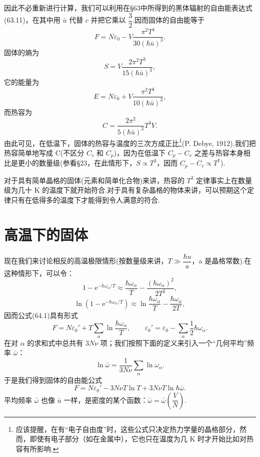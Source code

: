 因此不必重新进行计算，我们可以利用在§63中所得到的黑体辐射的自由能表达式(63.11)，在其中用 $\bar{u}$ 代替 $c$ 并把它乘以 $\dfrac{3}{2}$.因而固体的自由能等于
\begin{equation}
  F=N\varepsilon_0-V\frac{\pi^2T^4}{30(\hbar\bar{u})^3}.
\end{equation}
固体的熵为
\begin{equation}
  S=V\frac{2\pi^2T^3}{15(\hbar\bar{u})^3},
\end{equation}
它的能量为
\begin{equation}
  E=N\varepsilon_0+V\frac{\pi^2T^4}{10(\hbar\bar{u})^3},
\end{equation}
而热容为
\begin{equation}
  C=\frac{2\pi^2}{5(\hbar\bar{u})^3}T^3V.
\end{equation}
由此可见，在低温下，固体的热容与温度的三次方成正比\footnote{应该提醒，在有“电子自由度”时，这些公式只决定热力学量的晶格部分，然而，即使有电子部分（如在金属中），它也只在温度为几 $\mathrm{K}$ 时才开始比如对热容有所影响.}(P. Debye, 1912).我们把热容简单地写成 C(不区分 $C_v$ 和 $C_p$)，因为在低温下 $C_p-C_v$ 之差与热容本身相比是更小的数量级(参看§23，在此情形下，$S\propto T^3$，因而 $C_p-C_v\propto T^7$).

对于具有简单晶格的固体(元素和简单化合物)来讲，热容的 $T^3$ 定律事实上在数量级为几十 K 的温度下就开始符合.对于具有复杂晶格的物体来讲，可以预期这个定律只有在低得多的温度下才能得到令人满意的符合.

\section{高温下的固体}

现在我们来讨论相反的高温极限情形(按数量级来讲，$T\gg\dfrac{\hbar u}{a}$，a 是晶格常数).在这种情形下，可以令：
\begin{equation*}
  1-\mathrm{e}^{-\hbar\omega_\alpha/T}\approx\frac{\hbar\omega_\alpha}{T}-\frac{\left(\hbar\omega_\alpha\right)^2}{2T^2},
\end{equation*}
\begin{equation*}
  \ln\left(1-\mathrm{e}^{-\hbar\omega_\alpha/T}\right)\approx\ln\frac{\hbar\omega_\alpha}{T}-\frac{\hbar\omega_\alpha}{2T},
\end{equation*}
因而公式(64.1)具有形式
\begin{equation}
  F=N\varepsilon_0'+T\sum_\alpha\ln\frac{\hbar\omega_\alpha}{T},\qquad
  \varepsilon_0'=\varepsilon_0-\sum_\alpha\frac{1}{2}\hbar\omega_\alpha.
\end{equation}
在对 $\alpha$ 的求和式中总共有 $3N\nu$ 项；我们按照下面的定义来引入一个“几何平均”频率 $\bar{\omega}$：
\begin{equation}
  \ln\bar{\omega}=\frac{1}{3N\nu}\sum_\alpha\ln\omega_\alpha.
\end{equation}
于是我们得到固体的自由能公式
\begin{equation}
  F=N\varepsilon_0'-3N\nu T\ln T+3N\nu T\ln\hbar\bar{\omega}.
\end{equation}
平均频率 $\bar{\omega}$ 也像 $\bar{u}$ 一样，是密度的某个函数：$\bar{\omega}=\bar{\omega}\left(\dfrac{V}{N}\right)$.

